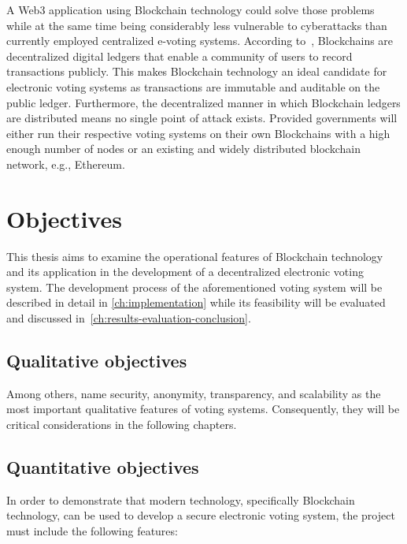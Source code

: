 A \Gls{Web3} application using \gls{Blockchain} technology could solve those problems while at the same time being considerably less vulnerable to cyberattacks than currently employed centralized e-voting systems.
According to~\textcite{yaga_blockchain_2018}, \glspl{Blockchain} are decentralized digital ledgers that enable a community of users to record transactions publicly.
This makes \gls{Blockchain} technology an ideal candidate for electronic voting systems as transactions are immutable and auditable on the public ledger.
Furthermore, the decentralized manner in which \gls{Blockchain} ledgers are distributed means no single point of attack exists.
Provided governments will either run their respective voting systems on their own \glspl{Blockchain} with a high enough number of nodes or an existing and widely distributed blockchain network, e.g., Ethereum.

\section{Objectives}\label{sec:objectives}

This thesis aims to examine the operational features of \gls{Blockchain} technology and its application in the development of a decentralized electronic voting system.
The development process of the aforementioned voting system will be described in detail in \cref{ch:implementation} while its feasibility will be evaluated and discussed in~\cref{ch:results-evaluation-conclusion}.

\subsection{Qualitative objectives}\label{subsec:qualitative-objectives}

Among others, \textcites[9-11]{jafar_blockchain_2021}[3]{diaz-santiso_e-voting_2021}{lowry_desirable_2009}[10-12]{tas_systematic_2020} name security, anonymity, transparency, and scalability as the most important qualitative features of voting systems.
Consequently, they will be critical considerations in the following chapters.

\subsection{Quantitative objectives}\label{subsec:quantitative-objectives}

In order to demonstrate that modern technology, specifically \gls{Blockchain} technology, can be used to develop a secure electronic voting system, the project must include the following features:

